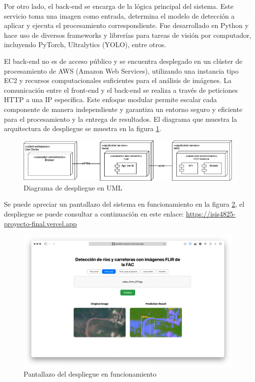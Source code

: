 Por otro lado, el back-end se encarga de la lógica principal del sistema. Este servicio toma una imagen como entrada, determina el modelo de detección a aplicar y ejecuta el procesamiento correspondiente. Fue desarrollado en Python y hace uso de diversos frameworks y librerías para tareas de visión por computador, incluyendo PyTorch, Ultralytics (YOLO), entre otros.

El back-end no es de acceso público y se encuentra desplegado en un clúster de procesamiento de AWS (Amazon Web Services), utilizando una instancia tipo EC2 y recursos computacionales suficientes para el análisis de imágenes. La comunicación entre el front-end y el back-end se realiza a través de peticiones HTTP a una IP específica. Este enfoque modular permite escalar cada componente de manera independiente y garantiza un entorno seguro y eficiente para el procesamiento y la entrega de resultados. El diagrama que muestra la arquitectura de despliegue se muestra en la figura \ref{fig:despliegue}.


\begin{figure}
    \centering
    \includegraphics[width=1\linewidth]{figures/diagrama-despliegue.drawio.png}
    \caption{Diagrama de despliegue en UML}
    \label{fig:despliegue}
\end{figure}

Se puede apreciar un pantallazo del sistema en funcionamiento en la figura \ref{fig:pantallazo}, el despliegue se puede consultar a continuación en este enlace: \href{https://isis4825-proyecto-final.vercel.app}{https://isis4825-proyecto-final.vercel.app}


\begin{figure}
    \centering
    \includegraphics[width=1\linewidth]{figures/pantallazo.png}
    \caption{Pantallazo del despliegue en funcionamiento}
    \label{fig:pantallazo}
\end{figure}